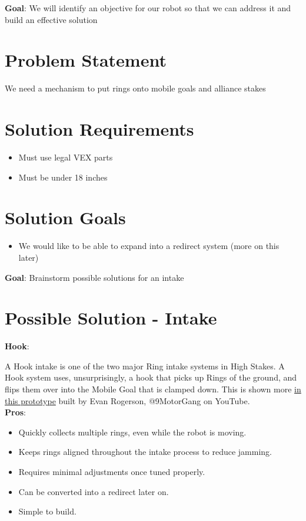 \textbf{Goal}: We will identify an objective for our robot so that we can address it and build an effective solution
\section*{Problem Statement}
We need a mechanism to put rings onto mobile goals and alliance stakes
\section*{Solution Requirements}
\begin{itemize}
    \item Must use legal VEX parts 
    \item Must be under 18 inches 
\end{itemize}
\section*{Solution Goals}
\begin{itemize}
    \item We would like to be able to expand into a redirect system (more on this later)
\end{itemize}
\textbf{Goal}: Brainstorm possible solutions for an intake
\section*{Possible Solution - Intake}
\noindent
\textbf{Hook}:

A Hook intake is one of the two major Ring intake systems in High Stakes. A Hook system uses, unsurprisingly, a hook that picks up Rings of the ground, and flips them over into the Mobile Goal that is clamped down. This is shown more \href{https://www.youtube.com/watch?v=ybP6bGynbs4&t=5s}{in this prototype} built by Evan Rogerson, @9MotorGang on YouTube. \\
\noindent
\textbf{Pros}:
\begin{itemize}
    \item Quickly collects multiple rings, even while the robot is moving.
    \item Keeps rings aligned throughout the intake process to reduce jamming.
    \item Requires minimal adjustments once tuned properly.
    \item Can be converted into a redirect later on.
    \item Simple to build.
\end{itemize}

